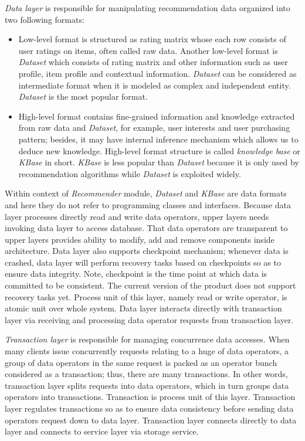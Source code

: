 \documentclass[a4paper,twoside]{article}
\begin{document}
\textit{Data layer} is responsible for manipulating recommendation data organized into two following formats:
\begin{itemize}
\item Low-level format is structured as rating matrix whose each row consists of user ratings on items, often called raw data. Another low-level format is \textit{Dataset} which consists of rating matrix and other information such as user profile, item profile and contextual information. \textit{Dataset} can be considered as intermediate format when it is modeled as complex and independent entity. \textit{Dataset} is the most popular format.
\item High-level format contains fine-grained information and knowledge extracted from raw data and \textit{Dataset}, for example, user interests and user purchasing pattern; besides, it may have internal inference mechanism which allows us to deduce new knowledge. High-level format structure is called \textit{knowledge base} or \textit{KBase} in short. \textit{KBase} is less popular than \textit{Dataset} because it is only used by recommendation algorithms while \textit{Dataset} is exploited widely.
\end{itemize}
Within context of \textit{Recommender} module, \textit{Dataset} and \textit{KBase} are data formats and here they do not refer to programming classes and interfaces. Because data layer processes directly read and write data operators, upper layers needs invoking data layer to access database. That data operators are transparent to upper layers provides ability to modify, add and remove components inside architecture. Data layer also supports checkpoint mechanism; whenever data is crashed, data layer will perform recovery tasks based on checkpoints so as to ensure data integrity. Note, checkpoint is the time point at which data is committed to be consistent. The current version of the product does not support recovery tasks yet. Process unit of this layer, namely read or write operator, is atomic unit over whole system. Data layer interacts directly with transaction layer via receiving and processing data operator requests from transaction layer.

\textit{Transaction layer} is responsible for managing concurrence data accesses. When many clients issue concurrently requests relating to a huge of data operators, a group of data operators in the same request is packed as an operator bunch considered as a transaction; thus, there are many transactions. In other words, transaction layer splits requests into data operators, which in turn groups data operators into transactions. Transaction is process unit of this layer. Transaction layer regulates transactions so as to ensure data consistency before sending data operators request down to data layer. Transaction layer connects directly to data layer and connects to service layer via storage service.
\end{document}

